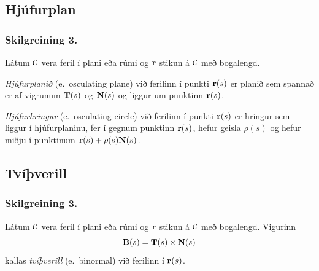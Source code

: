  \begin{figure} [h]
\begin {center}  \end {center}
\end {figure}      



\subsection{Hjúfurplan}
 \subsubsection{Skilgreining 3.}
   Látum $\cal C$ vera feril í plani eða rúmi og $\mbox{${\bf r}$}$ stikun á $\cal C$ með bogalengd.  

{\em Hjúfurplanið} (e.~osculating plane) við ferilinn í punkti $\mbox{${\bf r}$}(s)$ er planið sem spannað er af  vigrunum $\mbox{${\bf T}$}(s)$ og $\mbox{${\bf N}$}(s)$ og liggur um punktinn $\mbox{${\bf r}$}(s)$.

{\em Hjúfurhringur} (e.~osculating circle) við ferilinn í punkti
$\mbox{${\bf r}$}(s)$ er hringur sem liggur í hjúfurplaninu, fer í gegnum punktinn
$\mbox{${\bf r}$}(s)$, hefur geisla $\rho(s)$ og hefur miðju í punktinum
$\mbox{${\bf r}$}(s)+\rho(s)\mbox{${\bf N}$}(s)$. 
 



\subsection{Tvíþverill}
 \subsubsection{Skilgreining 3.}
   Látum $\cal C$ vera feril í plani eða rúmi og
$\mbox{${\bf r}$}$ stikun á $\cal C$ með bogalengd.  Vigurinn  
$$\mbox{${\bf B}$}(s)=\mbox{${\bf T}$}(s)\times \mbox{${\bf N}$}(s)$$
kallas {\em tvíþverill} (e.~binormal) við ferilinn í $\mbox{${\bf r}$}(s)$.
 

